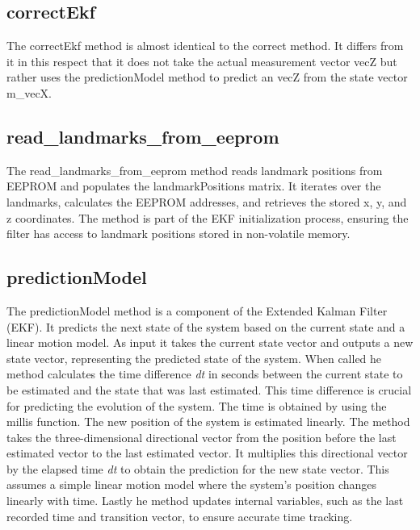 \subsection{correctEkf}
\label{sub:correctEkf}
The correctEkf method is almost identical to the correct method. 
It differs from it in this respect that it does not take the actual measurement vector vecZ but rather uses the predictionModel method to predict an vecZ from the state vector m\_vecX. 

\subsection{read\_landmarks\_from\_eeprom}
\label{sub:read_landmarks_from_eeprom}
The read\_landmarks\_from\_eeprom method reads landmark positions from EEPROM and populates the landmarkPositions matrix. It iterates over the landmarks, calculates the EEPROM addresses, and retrieves the stored x, y, and z coordinates. 
The method is part of the EKF initialization process, ensuring the filter has access to landmark positions stored in non-volatile memory.

\subsection{predictionModel}
\label{sub:predictionModel}
The predictionModel method is a component of the Extended Kalman Filter (EKF). It predicts the next state of the system based on the current state and a linear motion model. 
As input it takes the current state vector and outputs a new state vector, representing the predicted state of the system. 
\vspace{4pt}
\newline
When called he method calculates the time difference \textit{dt} in seconds between the current state to be estimated and the state that was last estimated. This time difference is crucial for predicting the evolution of the system. 
The time is obtained by using the millis function. 
\vspace{4pt}
\newline
The new position of the system is estimated linearly. The method takes the three-dimensional directional vector from the position before the last estimated vector to the last estimated vector. It multiplies this directional vector by the elapsed time \textit{dt} to obtain the prediction for the new state vector. 
This assumes a simple linear motion model where the system's position changes linearly with time.
\vspace{4pt}
\newline
Lastly he method updates internal variables, such as the last recorded time and transition vector, to ensure accurate time tracking.

